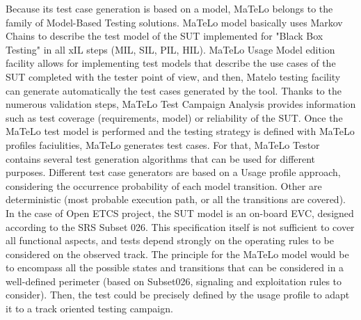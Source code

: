 Because its test case generation is based on a model, MaTeLo belongs
to the family of Model-Based Testing solutions. MaTeLo model basically
uses Markov Chains to describe the test model of the SUT implemented
for "Black Box Testing" in all xIL steps (MIL, SIL, PIL, HIL).  MaTeLo
Usage Model edition facility allows for implementing test models that
describe the use cases of the SUT completed with the tester point of
view, and then, Matelo testing facility can generate automatically the
test cases generated by the tool.  Thanks to the numerous validation
steps, MaTeLo Test Campaign Analysis provides information such as test
coverage (requirements, model) or reliability of the SUT.  Once the
MaTeLo test model is performed and the testing strategy is defined
with MaTeLo profiles faciulities, MaTeLo generates test cases. For
that, MaTeLo Testor contains several test generation algorithms that
can be used for different purposes. Different test case generators are
based on a Usage profile approach, considering the occurrence
probability of each model transition. Other are deterministic (most
probable execution path, or all the transitions are covered).  In the
case of Open ETCS project, the SUT model is an on-board EVC, designed
according to the SRS Subset 026. This specification itself is not
sufficient to cover all functional aspects, and tests depend strongly
on the operating rules to be considered on the observed track. The
principle for the MaTeLo model would be to encompass all the possible
states and transitions that can be considered in a well-defined
perimeter (based on Subset026, signaling and exploitation rules to
consider). Then, the test could be precisely defined by the usage
profile to adapt it to a track oriented testing campaign.

